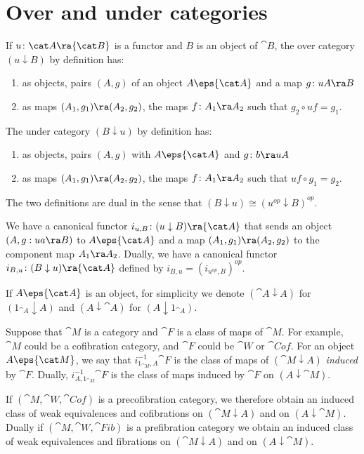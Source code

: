 \section{Over and under categories}
\label{sec:catoverunder}
If $u \colon {\cat A} \ra {\cat B}$ is a functor and $B$ is an object of ${\cat B}$, the over category $(u \downarrow B)$ by definition has:
\begin{enumerate}
\item
as objects, pairs $(A, g)$ of an object $A \eps {\cat A}$ and a map $g \colon uA \ra B$
\item
as maps $(A_1, g_1) \ra (A_2, g_2)$, the maps $f \colon A_1 \ra A_2$ such that $g_2 \circ uf = g_1$.
\end{enumerate}
The under category $(B \downarrow u)$ by definition has:
\begin{enumerate}
\item
as objects, pairs $(A, g)$ with $A \eps {\cat A}$ and $g \colon b \ra uA$
\item
as maps $(A_1, g_1) \ra (A_2, g_2)$, the maps $f \colon A_1 \ra A_2$ such that $uf \circ g_1 = g_2$.
\end{enumerate}

The two definitions are dual in the sense that $(B \downarrow u) \cong (u^{op} \downarrow B)^{op}$.

We have a canonical functor $i_{u, B} \colon (u \downarrow B) \ra {\cat A}$ that sends an object $(A, g: ua \ra B)$ to $A \eps {\cat A}$ and a map $(A_1, g_1) \ra (A_2, g_2)$ to the component map $A_1 \ra A_2$. Dually, we have a canonical functor $i_{B, u} \colon (B \downarrow u) \ra {\cat A}$ defined by $i_{B, u} = (i_{u^{op}, B})^{op}$.

If $A \eps {\cat A}$ is an object, for simplicity we denote $({\cat A} \downarrow A)$ for $(1_{\cat A} \downarrow A)$ and $(A \downarrow {\cat A})$ for $(A \downarrow 1_{\cat A})$. 

Suppose that ${\cat M}$ is a category and ${\cat F}$ is a class of maps of ${\cat M}$. For example, ${\cat M}$ could be a cofibration category, and ${\cat F}$ could be ${\cat W}$ or ${\cat Cof}$. For an object $A \eps {\cat M}$, we say that $i_{1_{\cat M}, A}^{-1} {\cat F}$ is the class of maps of $({\cat M} \downarrow A)$ {\it induced} by ${\cat F}$. Dually, $i_{A, 1_{\cat M}}^{-1} {\cat F}$ is the class of maps induced by ${\cat F}$ on $(A \downarrow {\cat M})$.

If $({\cat M}, {\cat W}, {\cat Cof})$ is a precofibration category, we therefore obtain an induced class of weak equivalences and cofibrations on $({\cat M} \downarrow A)$ and on $(A \downarrow {\cat M})$. Dually if $({\cat M}, {\cat W}, {\cat Fib})$ is a prefibration category we obtain an induced class of weak equivalences and fibrations on $({\cat M} \downarrow A)$ and on $(A \downarrow {\cat M})$.

